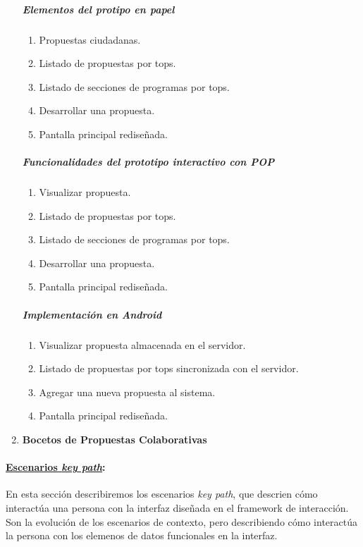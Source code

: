 \begin{enumerate}[label=\textbf{\arabic*})]
\subparagraph{Elementos del protipo en papel}

\begin{enumerate}
 \item Propuestas ciudadanas.
 \item Listado de propuestas por tops.
 \item Listado de secciones de programas por tops.
 \item Desarrollar una propuesta.
 \item Pantalla principal rediseñada.
\end{enumerate}

\subparagraph{Funcionalidades del prototipo interactivo con POP}

\begin{enumerate}
 \item Visualizar propuesta.
 \item Listado de propuestas por tops.
 \item Listado de secciones de programas por tops.
 \item Desarrollar una propuesta.
 \item Pantalla principal rediseñada.
\end{enumerate}

\subparagraph{Implementación en Android}

\begin{enumerate}
 \item Visualizar propuesta almacenada en el servidor.
 \item Listado de propuestas por tops sincronizada con el servidor.
 \item Agregar una nueva propuesta al sistema.
 \item Pantalla principal rediseñada.
\end{enumerate}

\item \textbf{Bocetos de Propuestas Colaborativas}

\end{enumerate}

\paragraph{\underline{Escenarios \textit{key path}}:}

En esta sección describiremos los escenarios \textit{key path}, que descrien cómo interactúa una persona con la interfaz diseñada en el framework de interacción. Son la evolución de los escenarios de contexto, pero describiendo cómo interactúa la persona con los elemenos de datos funcionales en la interfaz.

